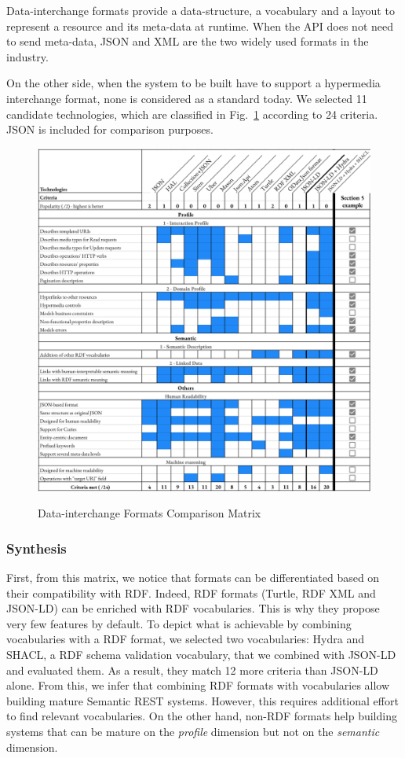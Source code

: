 Data-interchange formats provide a data-structure, a vocabulary and a layout to represent a resource and its meta-data at runtime. When the API does not need to send meta-data, JSON and XML are the two widely used formats in the industry.

On the other side, when the system to be built have to support a hypermedia interchange format, none is considered as a standard today. We selected 11 candidate technologies, which are classified in Fig.~\ref{interchange-formats-matrix} according to 24 criteria. JSON is included for comparison purposes.

\begin{figure}[!ht]
\caption{Data-interchange Formats Comparison Matrix}
\includegraphics[width=1\textwidth]{figures/DIF.png}
\label{interchange-formats-matrix}
\vspace*{-0.7cm}
\end{figure}

\subsubsection*{Synthesis}
First, from this matrix, we notice that formats can be differentiated based on their compatibility with RDF. Indeed, RDF formats (Turtle, RDF XML and JSON-LD) can be enriched with RDF vocabularies. This is why they propose very few features by default. To depict what is achievable by combining vocabularies with a RDF format, we selected two vocabularies: Hydra and SHACL, a RDF schema validation vocabulary, that we combined with JSON-LD and evaluated them. As a result, they match 12 more criteria than JSON-LD alone.
From this, we infer that combining RDF formats with vocabularies allow building mature Semantic REST systems. However, this requires additional effort to find relevant vocabularies.
On the other hand, non-RDF formats help building systems that can be mature on the \textit{profile} dimension but not on the \textit{semantic} dimension.

